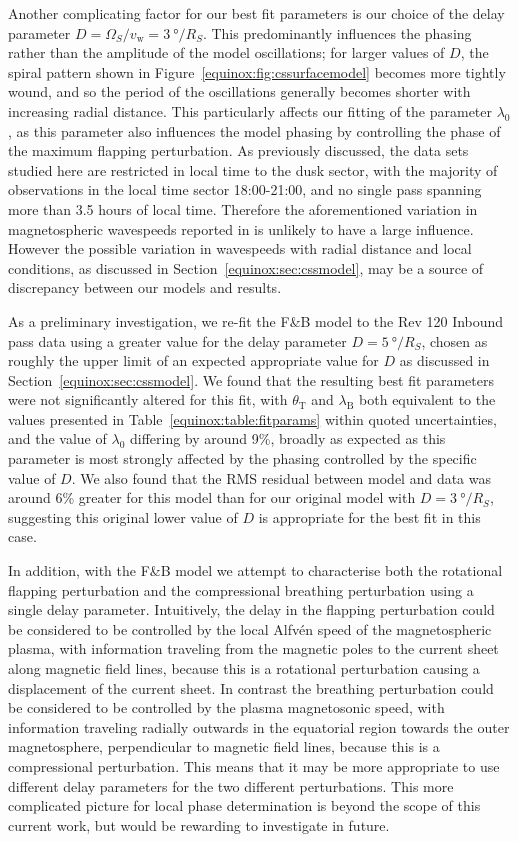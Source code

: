 Another complicating factor for our best fit parameters is our choice of the delay parameter $D = \Omega_S/v_\mathrm{w} = \SI{3}{\degree/R_S}$. This predominantly influences the phasing rather than the amplitude of the model oscillations; for larger values of $D$, the spiral pattern shown in Figure~\ref{equinox:fig:cssurfacemodel} becomes more tightly wound, and so the period of the oscillations generally becomes shorter with increasing radial distance. This particularly affects our fitting of the parameter $\lambda_0$, as this parameter also influences the model phasing by controlling the phase of the maximum flapping perturbation. As previously discussed, the data sets studied here are restricted in local time to the dusk sector, with the majority of observations in the local time sector 18:00{\--}21:00, and no single pass spanning more than 3.5 hours of local time. Therefore the aforementioned variation in magnetospheric wavespeeds reported in \citet{andrews2010} is unlikely to have a large influence. However the possible variation in wavespeeds with radial distance and local conditions, as discussed in Section~\ref{equinox:sec:cssmodel}, may be a source of discrepancy between our models and results. 

As a preliminary investigation, we re-fit the F{\&}B model to the Rev 120 Inbound pass data using a greater value for the delay parameter $D = \SI{5}{\degree/R_S}$, chosen as roughly the upper limit of an expected appropriate value for $D$ as discussed in Section~\ref{equinox:sec:cssmodel}. We found that the resulting best fit parameters were not significantly altered for this fit, with $\theta_\mathrm{T}$ and $\lambda_\mathrm{B}$ both equivalent to the values presented in Table~\ref{equinox:table:fitparams} within quoted uncertainties, and the value of $\lambda_0$ differing by around 9\%, broadly as expected as this parameter is most strongly affected by the phasing controlled by the specific value of $D$. We also found that the RMS residual between model and data was around 6\% greater for this model than for our original model with $D = \SI{3}{\degree/R_S}$, suggesting this original lower value of $D$ is appropriate for the best fit in this case.

In addition, with the F{\&}B model we attempt to characterise both the rotational flapping perturbation and the compressional breathing perturbation using a single delay parameter. Intuitively, the delay in the flapping perturbation could be considered to be controlled by the local Alfv\'{e}n speed of the magnetospheric plasma, with information traveling from the magnetic poles to the current sheet along magnetic field lines, because this is a rotational perturbation causing a displacement of the current sheet. In contrast the breathing perturbation could be considered to be controlled by the plasma magnetosonic speed, with information traveling radially outwards in the equatorial region towards the outer magnetosphere, perpendicular to magnetic field lines, because this is a compressional perturbation. This means that it may be more appropriate to use different delay parameters for the two different perturbations. This more complicated picture for local phase determination is beyond the scope of this current work, but would be rewarding to investigate in future.


